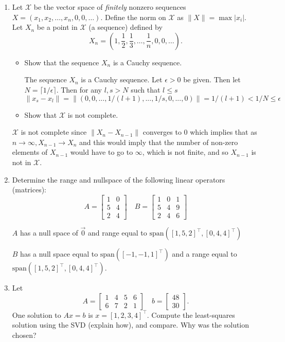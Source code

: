 \documentclass{article}
\begin{document}
\begin{enumerate}
\color{black}

\item
Let $\mathcal X$ be the vector space of \emph{finitely} nonzero sequences $X=(x_1, x_2, \ldots, x_n, 0, 0, \ldots)$.
Define the norm on $\mathcal X$ as $\|X\|=\max |x_i|$.
Let $X_n$ be a point in $\mathcal X$ (a sequence) defined by
$$X_n = \left(1, \frac{1}{2}, \frac{1}{3}, \ldots, \frac{1}{n}, 0, 0, \ldots \right).$$

\begin{itemize}
\item
Show that the sequence $X_n$ is a Cauchy sequence.

\color{blue}
The sequence $X_n$ is a Cauchy sequence. Let $\epsilon > 0$ be given. 
Then let $N= \lceil 1/\epsilon \rceil$. Then for any $l,s > N$
such that $l \leq s$
$$
\|x_s - x_l\| = \|(0,0,...,1/(l+1), ..., 1/s,0,...,0)\| = 1/(l+1) < 1/N \leq \epsilon
$$
\color{black}

\item
Show that $\mathcal X$ is not complete.
\end{itemize}

\color{blue}

$\mathcal X$ is not complete since $\|X_n - X_{n-1}\|$ converges to 0 which implies that as $n \to \infty, X_{n-1} \to X_n$ and this would imply that the number of non-zero elements of $X_{n-1}$ would have to go to $\infty$, which is not finite, and so $X_{n-1}$ is not in $\mathcal X$. 
\color{black}



\item
Determine the range and nullspace of the following linear operators (matrices):
$$A=
\begin{bmatrix}
1 & 0 \\
5 & 4 \\
2 & 4
\end{bmatrix}
\quad
B=
\begin{bmatrix}
1 & 0 & 1 \\
5 & 4 & 9 \\
2 & 4 & 6
\end{bmatrix}
$$

\color{blue}
$A$ has a null space of $\vec{0}$ and range equal to $\text{span}([1,5,2]^\top, [0,4,4]^\top)$

$B$ has a null space equal to $\text{span}([-1,-1,1]^\top)$ and a range equal to $\text{span}([1,5,2]^\top, [0,4,4]^\top)$.
\color{black}


\item
Let 
$$A=\begin{bmatrix}
1 & 4 & 5 & 6 \\
6 & 7 & 2 & 1
\end{bmatrix}
\quad
b=\begin{bmatrix}
48\\
30
\end{bmatrix}.$$
One solution to $Ax=b$ is $x=[1,2,3,4]^\top$.  Compute the least-squares solution using the SVD (explain how), and compare. Why was the solution chosen?


\end{enumerate}
\end{document}
